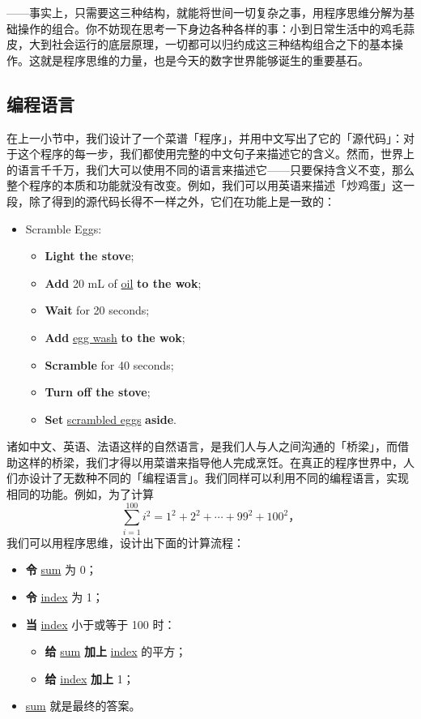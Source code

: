 ——事实上，只需要这三种结构，就能将世间一切复杂之事，用程序思维分解为基础操作的组合。你不妨现在思考一下身边各种各样的事：小到日常生活中的鸡毛蒜皮，大到社会运行的底层原理，一切都可以归约成这三种结构组合之下的基本操作。这就是程序思维的力量，也是今天的数字世界能够诞生的重要基石。

\subsection{编程语言}

在上一小节中，我们设计了一个菜谱「程序」，并用中文写出了它的「源代码」：对于这个程序的每一步，我们都使用完整的中文句子来描述它的含义。然而，世界上的语言千千万，我们大可以使用不同的语言来描述它——只要保持含义不变，那么整个程序的本质和功能就没有改变。例如，我们可以用英语来描述「炒鸡蛋」这一段，除了得到的源代码长得不一样之外，它们在功能上是一致的：

\begin{itemize}
  \item Scramble Eggs:
    \begin{itemize}
      \item \textbf{Light the stove};
      \item \textbf{Add} 20 mL of \underline{oil} \textbf{to the wok};
      \item \textbf{Wait} for 20 seconds;
      \item \textbf{Add} \underline{egg wash} \textbf{to the wok};
      \item \textbf{Scramble} for 40 seconds;
      \item \textbf{Turn off the stove};
      \item \textbf{Set} \underline{scrambled eggs} \textbf{aside}.
    \end{itemize}
\end{itemize}

诸如中文、英语、法语这样的自然语言，是我们人与人之间沟通的「桥梁」，而借助这样的桥梁，我们才得以用菜谱来指导他人完成烹饪。在真正的程序世界中，人们亦设计了无数种不同的「编程语言」。我们同样可以利用不同的编程语言，实现相同的功能。例如，为了计算
\[ \sum_{i=1}^{100} i^2=1^2+2^2+\cdots+99^2+100^2\text{，} \]
我们可以用程序思维，设计出下面的计算流程：

\begin{itemize}
  \item \textbf{令} \underline{sum} 为 0；
  \item \textbf{令} \underline{index} 为 1；
  \item \textbf{当} \underline{index} 小于或等于 100 时：
    \begin{itemize}
      \item \textbf{给} \underline{sum} \textbf{加上} \underline{index} 的平方；
      \item \textbf{给} \underline{index} \textbf{加上} 1；
    \end{itemize}
  \item \underline{sum} 就是最终的答案。
\end{itemize}

